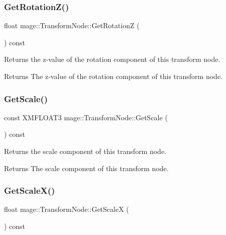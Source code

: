 \subsubsection{\texorpdfstring{Get\+Rotation\+Z()}{GetRotationZ()}}
{\footnotesize\ttfamily float mage\+::\+Transform\+Node\+::\+Get\+RotationZ (\begin{DoxyParamCaption}{ }\end{DoxyParamCaption}) const\hspace{0.3cm}{\ttfamily [noexcept]}}

Returns the z-\/value of the rotation component of this transform node.

\begin{DoxyReturn}{Returns}
The z-\/value of the rotation component of this transform node. 
\end{DoxyReturn}
\hypertarget{structmage_1_1_transform_node_a23109efb661cb17d3957286952334dc2}{}\label{structmage_1_1_transform_node_a23109efb661cb17d3957286952334dc2} 
\subsubsection{\texorpdfstring{Get\+Scale()}{GetScale()}}
{\footnotesize\ttfamily const X\+M\+F\+L\+O\+A\+T3 mage\+::\+Transform\+Node\+::\+Get\+Scale (\begin{DoxyParamCaption}{ }\end{DoxyParamCaption}) const\hspace{0.3cm}{\ttfamily [noexcept]}}

Returns the scale component of this transform node.

\begin{DoxyReturn}{Returns}
The scale component of this transform node. 
\end{DoxyReturn}
\hypertarget{structmage_1_1_transform_node_a88dcc4437775940b62854fb6d850a0a6}{}\label{structmage_1_1_transform_node_a88dcc4437775940b62854fb6d850a0a6} 
\subsubsection{\texorpdfstring{Get\+Scale\+X()}{GetScaleX()}}
{\footnotesize\ttfamily float mage\+::\+Transform\+Node\+::\+Get\+ScaleX (\begin{DoxyParamCaption}{ }\end{DoxyParamCaption}) const\hspace{0.3cm}{\ttfamily [noexcept]}}

